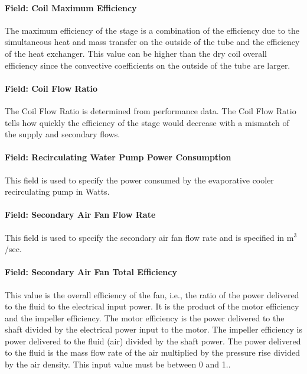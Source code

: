 \paragraph{Field: Coil Maximum Efficiency}\label{field-coil-maximum-efficiency}

The maximum efficiency of the stage is a combination of the efficiency due to the simultaneous heat and mass transfer on the outside of the tube and the efficiency of the heat exchanger. This value can be higher than the dry coil overall efficiency since the convective coefficients on the outside of the tube are larger.

\paragraph{Field: Coil Flow Ratio}\label{field-coil-flow-ratio}

The Coil Flow Ratio is determined from performance data. The Coil Flow Ratio tells how quickly the efficiency of the stage would decrease with a mismatch of the supply and secondary flows.

\paragraph{Field: Recirculating Water Pump Power Consumption}\label{field-recirculating-water-pump-power-consumption-2}

This field is used to specify the power consumed by the evaporative cooler recirculating pump in Watts.

\paragraph{Field: Secondary Air Fan Flow Rate}\label{field-secondary-air-fan-flow-rate-1}

This field is used to specify the secondary air fan flow rate and is specified in m\(^{3}\)/sec.

\paragraph{Field: Secondary Air Fan Total Efficiency}\label{field-secondary-air-fan-total-efficiency}

This value is the overall efficiency of the fan, i.e., the ratio of the power delivered to the fluid to the electrical input power. It is the product of the motor efficiency and the impeller efficiency. The motor efficiency is the power delivered to the shaft divided by the electrical power input to the motor. The impeller efficiency is power delivered to the fluid (air) divided by the shaft power. The power delivered to the fluid is the mass flow rate of the air multiplied by the pressure rise divided by the air density. This input value must be between 0 and 1..

